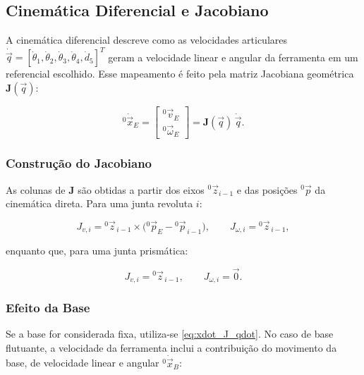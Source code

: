 \subsection{Cinemática Diferencial e Jacobiano}
\label{sec:cinematica_diferencial_jacobiano}

A cinemática diferencial descreve como as velocidades articulares 
$\dot{\vec q} = [\dot\theta_1,\dot\theta_2,\dot\theta_3,\dot\theta_4,\dot d_5]^T$
geram a velocidade linear e angular da ferramenta em um referencial escolhido.
Esse mapeamento é feito pela matriz Jacobiana geométrica $\mathbf{J}(\vec q)$:

\begin{equation}
\label{eq:xdot_J_qdot}
{}^{0}\!\dot{\vec x}_{E} =
\begin{bmatrix}
{}^{0}\!\vec v_{E} \\
{}^{0}\!\vec \omega_{E}
\end{bmatrix}
= \mathbf{J}(\vec q)\,\dot{\vec q}.
\end{equation}

\subsubsection{Construção do Jacobiano}

As colunas de $\mathbf{J}$ são obtidas a partir dos eixos ${}^{0}\!\vec z_{i-1}$ e das posições ${}^{0}\!\vec p$ da cinemática direta. Para uma junta revoluta $i$:

\begin{equation}
J_{v,i} = {}^{0}\!\vec z_{\,i-1} \times 
\big({}^{0}\!\vec p_{E} - {}^{0}\!\vec p_{\,i-1}\big),
\qquad
J_{\omega,i} = {}^{0}\!\vec z_{\,i-1},
\end{equation}

enquanto que, para uma junta prismática:

\begin{equation}
J_{v,i} = {}^{0}\!\vec z_{\,i-1}, 
\qquad
J_{\omega,i} = \vec 0.
\end{equation}

\subsubsection{Efeito da Base}

Se a base for considerada fixa, utiliza-se \eqref{eq:xdot_J_qdot}.
No caso de base flutuante, a velocidade da ferramenta inclui a contribuição do movimento da base, de velocidade linear e angular ${}^{0}\!\dot{\vec x}_B$:

